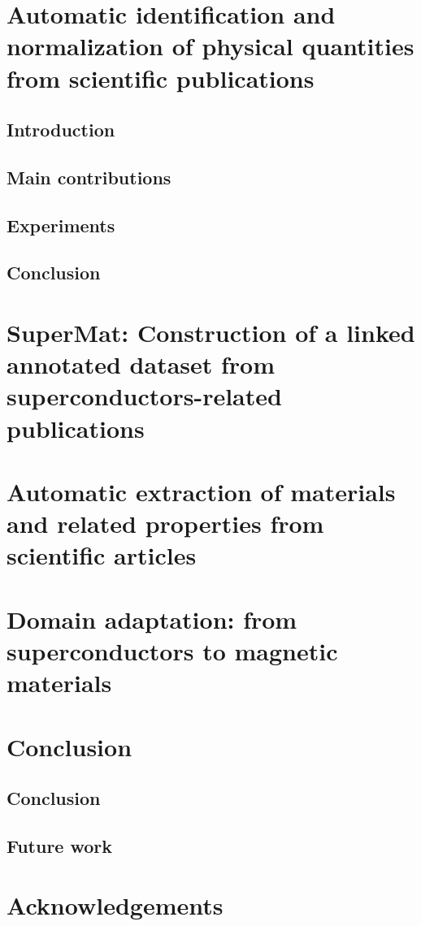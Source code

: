\documentclass[12pt, a4paper]{report}
\begin{document}
\chapter{Automatic identification and normalization of physical quantities from scientific publications}
\section{Introduction}
\section{Main contributions}
\section{Experiments}
\section{Conclusion}

\chapter{SuperMat: Construction of a linked annotated dataset from superconductors-related publications}

\chapter{Automatic extraction of materials and related properties from scientific articles}

\chapter{Domain adaptation: from superconductors to magnetic materials}

\chapter{Conclusion}
\section{Conclusion}
\section{Future work}

\chapter*{Acknowledgements}
\newpage



\end{document}
